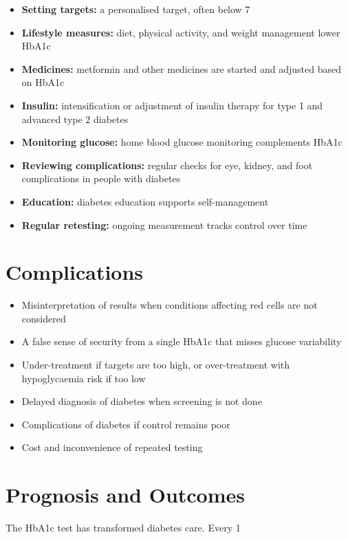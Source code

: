 \begin{itemize}
    \item \textbf{Setting targets:} a personalised target, often below 7%
    \item \textbf{Lifestyle measures:} diet, physical activity, and weight management lower HbA1c
    \item \textbf{Medicines:} metformin and other medicines are started and adjusted based on HbA1c
    \item \textbf{Insulin:} intensification or adjustment of insulin therapy for type 1 and advanced type 2 diabetes
    \item \textbf{Monitoring glucose:} home blood glucose monitoring complements HbA1c
    \item \textbf{Reviewing complications:} regular checks for eye, kidney, and foot complications in people with diabetes
    \item \textbf{Education:} diabetes education supports self-management
    \item \textbf{Regular retesting:} ongoing measurement tracks control over time
\end{itemize}

\section*{Complications}
\begin{itemize}
    \item Misinterpretation of results when conditions affecting red cells are not considered
    \item A false sense of security from a single HbA1c that misses glucose variability
    \item Under-treatment if targets are too high, or over-treatment with hypoglycaemia risk if too low
    \item Delayed diagnosis of diabetes when screening is not done
    \item Complications of diabetes if control remains poor
    \item Cost and inconvenience of repeated testing
\end{itemize}

\section*{Prognosis and Outcomes}
The HbA1c test has transformed diabetes care. Every 1%

